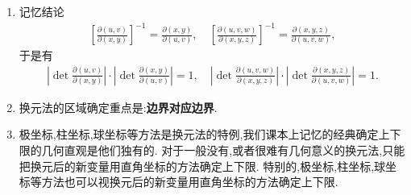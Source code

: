 \documentclass[../../main.tex]{subfiles}
\begin{document}
\begin{note}
\begin{enumerate}
\item 记忆结论
\begin{align*}
\left[\frac{\partial(u,v)}{\partial(x,y)}\right]^{-1} = \frac{\partial(x,y)}{\partial(u,v)}, \quad \left[\frac{\partial(u,v,w)}{\partial(x,y,z)}\right]^{-1} = \frac{\partial(x,y,z)}{\partial(u,v,w)},
\end{align*}
于是有
\begin{align*}
\left|\det \frac{\partial(u,v)}{\partial(x,y)}\right| \cdot \left|\det \frac{\partial(x,y)}{\partial(u,v)}\right| = 1,\quad  \left|\det \frac{\partial(u,v,w)}{\partial(x,y,z)}\right| \cdot \left|\det \frac{\partial(x,y,z)}{\partial(u,v,w)}\right| = 1.
\end{align*}

\item 换元法的区域确定重点是:\textbf{边界对应边界}.

\item 极坐标,柱坐标,球坐标等方法是换元法的特例,我们课本上记忆的经典确定上下限的几何直观是他们独有的. 对于一般没有,或者很难有几何意义的换元法,只能把换元后的新变量用直角坐标的方法确定上下限. 特别的,极坐标,柱坐标,球坐标等方法也可以视换元后的新变量用直角坐标的方法确定上下限.
\end{enumerate}
\end{note}
\end{document}
